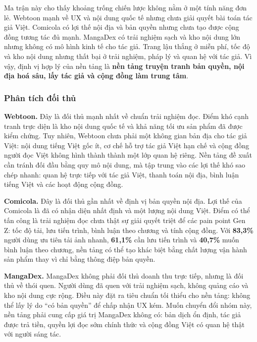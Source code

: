 Ma trận này cho thấy khoảng trống chiến lược không nằm ở một tính năng đơn lẻ. Webtoon mạnh về UX và nội dung quốc tế nhưng chưa giải quyết bài toán tác giả Việt. Comicola có lợi thế nội địa và bản quyền nhưng chưa tạo được cộng đồng tương tác đủ mạnh. MangaDex có trải nghiệm sạch và kho nội dung lớn nhưng không có mô hình kinh tế cho tác giả. Trang lậu thắng ở miễn phí, tốc độ và kho nội dung nhưng thất bại ở trải nghiệm, pháp lý và quan hệ với tác giả. Vì vậy, định vị hợp lý của nền tảng là \textbf{nền tảng truyện tranh bản quyền, nội địa hoá sâu, lấy tác giả và cộng đồng làm trung tâm}.

\subsubsection{Phân tích đối thủ}

\textbf{Webtoon.} Đây là đối thủ mạnh nhất về chuẩn trải nghiệm đọc. Điểm khó cạnh tranh trực diện là kho nội dung quốc tế và khả năng tối ưu sản phẩm đã được kiểm chứng. Tuy nhiên, Webtoon chưa phải một không gian bản địa cho tác giả Việt: nội dung tiếng Việt gốc ít, cơ chế hỗ trợ tác giả Việt hạn chế và cộng đồng người đọc Việt không hình thành thành một lớp quan hệ riêng. Nền tảng đề xuất cần tránh đối đầu bằng quy mô nội dung, mà tập trung vào các lợi thế khó sao chép nhanh: quan hệ trực tiếp với tác giả Việt, thanh toán nội địa, bình luận tiếng Việt và các hoạt động cộng đồng.

\textbf{Comicola.} Đây là đối thủ gần nhất về định vị bản quyền nội địa. Lợi thế của Comicola là đã có nhận diện nhất định và một lượng nội dung Việt. Điểm có thể tấn công là trải nghiệm đọc chưa thật sự giải quyết triệt để các pain point Gen Z: tốc độ tải, lưu tiến trình, bình luận theo chương và tính cộng đồng. Với \textbf{83{,}3\%} người dùng ưu tiên tải ảnh nhanh, \textbf{61{,}1\%} cần lưu tiến trình và \textbf{40{,}7\%} muốn bình luận theo chương, nền tảng có thể tạo khác biệt bằng chất lượng vận hành sản phẩm thay vì chỉ bằng thông điệp bản quyền.

\textbf{MangaDex.} MangaDex không phải đối thủ doanh thu trực tiếp, nhưng là đối thủ về thói quen. Người dùng đã quen với trải nghiệm sạch, không quảng cáo và kho nội dung cực rộng. Điều này đặt ra tiêu chuẩn tối thiểu cho nền tảng: không thể lấy lý do ``có bản quyền'' để chấp nhận UX kém. Muốn chuyển đổi nhóm này, nền tảng phải cung cấp giá trị MangaDex không có: bản dịch ổn định, tác giả được trả tiền, quyền lợi đọc sớm chính thức và cộng đồng Việt có quan hệ thật với người sáng tác.

